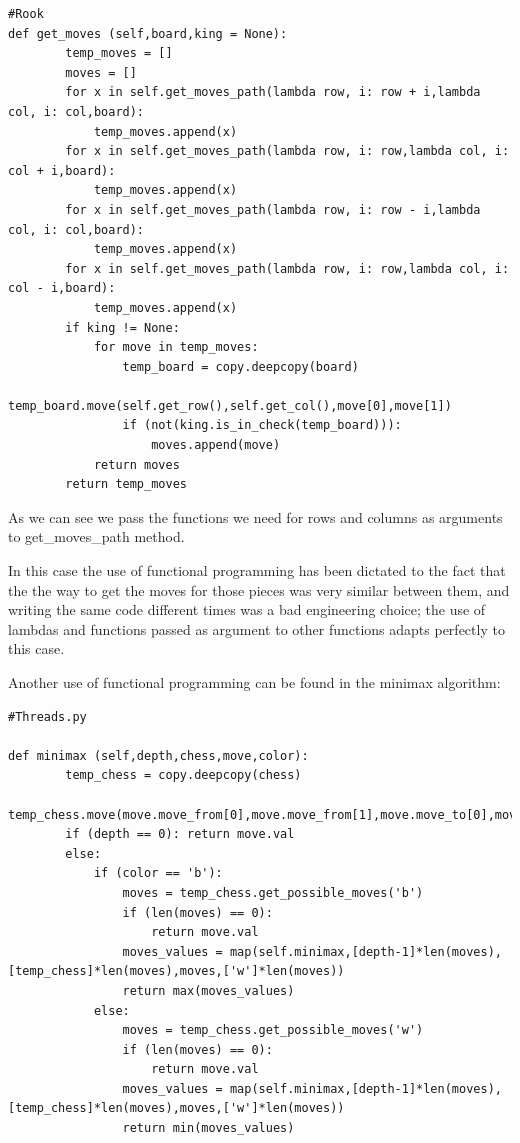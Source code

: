 \documentclass[english]{article}
\begin{document}
\begin{lstlisting}
#Rook
def get_moves (self,board,king = None):
        temp_moves = []
        moves = []
        for x in self.get_moves_path(lambda row, i: row + i,lambda col, i: col,board):
            temp_moves.append(x)
        for x in self.get_moves_path(lambda row, i: row,lambda col, i: col + i,board):
            temp_moves.append(x)
        for x in self.get_moves_path(lambda row, i: row - i,lambda col, i: col,board):
            temp_moves.append(x)
        for x in self.get_moves_path(lambda row, i: row,lambda col, i: col - i,board):
            temp_moves.append(x)
        if king != None:
            for move in temp_moves:
                temp_board = copy.deepcopy(board)
                temp_board.move(self.get_row(),self.get_col(),move[0],move[1])
                if (not(king.is_in_check(temp_board))):
                    moves.append(move)
            return moves
        return temp_moves
\end{lstlisting}

As we can see we pass the functions we need for rows and columns as arguments to get\_moves\_path method.

In this case the use of functional programming has been dictated to the fact that the the way to get the moves for those pieces was very similar between them, and writing the same code different times was a bad engineering choice; the use of lambdas and functions passed as argument to other functions adapts perfectly to this case.

Another use of functional programming can be found in the minimax algorithm:

\begin{lstlisting}
#Threads.py

def minimax (self,depth,chess,move,color):
        temp_chess = copy.deepcopy(chess)
        temp_chess.move(move.move_from[0],move.move_from[1],move.move_to[0],move.move_to[1])
        if (depth == 0): return move.val
        else:
            if (color == 'b'):
                moves = temp_chess.get_possible_moves('b')
                if (len(moves) == 0):
                    return move.val
                moves_values = map(self.minimax,[depth-1]*len(moves),[temp_chess]*len(moves),moves,['w']*len(moves))
                return max(moves_values)
            else:
                moves = temp_chess.get_possible_moves('w')
                if (len(moves) == 0):
                    return move.val
                moves_values = map(self.minimax,[depth-1]*len(moves),[temp_chess]*len(moves),moves,['w']*len(moves))
                return min(moves_values)
\end{lstlisting}
\end{document}
